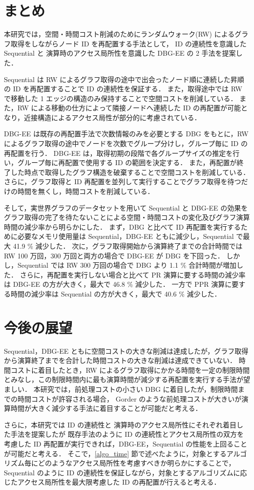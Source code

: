 \section{まとめ}
本研究では，空間・時間コスト削減のためにランダムウォーク(RW) によるグラフ取得をしながらノード ID を再配置する手法として，
ID の連続性を意識した Sequential と 演算時のアクセス局所性を意識した DBG-EE の 2 手法を提案した．

Sequential は RW によるグラフ取得の途中で出会ったノード順に連続した昇順の ID を再配置することで ID の連続性を保証する．
また，取得途中では RW で移動した 1 エッジの構造のみ保持することで空間コストを削減している．
また，RW による移動の仕方によって隣接ノードへ連続した ID の再配置が可能となり，近接構造によるアクセス局性が部分的に考慮されている．

DBG-EE は既存の再配置手法で次数情報のみを必要とする DBG をもとに，RW によるグラフ取得の途中でノードを次数でグループ分けし，グループ毎に ID の再配置を行う．
DBG-EE は，取得初期の段階で各グループサイズの推定を行い，グループ毎に再配置で使用する ID の範囲を決定する．
また，再配置が終了した時点で取得したグラフ構造を破棄することで空間コストを削減している．
さらに，グラフ取得と ID 再配置を並列して実行することでグラフ取得を待つだけの時間を無くし，時間コストを削減している．

そして，実世界グラフのデータセットを用いて Sequential と DBG-EE の効果をグラフ取得の完了を待たないことによる空間・時間コストの変化及びグラフ演算時間の減少率から明らかにした．
まず，DBG と比べて ID 再配置を実行するために必要なメモリ使用量は Sequential，DBG-EE ともに減少し，Sequential で最大 41.9 \% 減少した．
次に，グラフ取得開始から演算終了までの合計時間では RW 100 万回，300 万回と両方の場合で DBG-EE が DBG を下回った．
しかし，Sequential では RW 300 万回の場合で DBG より 1.1 \% 合計時間が増加した．
さらに，再配置を実行しない場合と比べて PR 演算に要する時間の減少率は DBG-EE の方が大きく，最大で 46.8 \% 減少した．
一方で PPR 演算に要する時間の減少率は Sequential の方が大きく，最大で 40.6 \% 減少した．

\section{今後の展望}
Sequential，DBG-EE ともに空間コストの大きな削減は達成したが，グラフ取得から演算終了までを合計した時間コストの大きな削減は達成できていない．
時間コストに着目したとき，RW によるグラフ取得にかかる時間を一定の制限時間とみなし，この制限時間内に最も演算時間が減少する再配置を実行する手法が望ましい．
本研究では，前処理コストの小さい DBG に着目したが，制限時間までの時間コストが許容される場合，
Gorder のような前処理コストが大きいが演算時間が大きく減少する手法に着目することが可能だと考える．

さらに，本研究では ID の連続性と 演算時のアクセス局所性にそれぞれ着目した手法を提案したが
既存手法のように ID の連続性とアクセス局所性の双方を考慮した ID 再配置が実行できれば，DBG-EE，Sequential の性能を上回ることが可能だと考える．
そこで，\ref{algo_time} 節で述べたように，対象とするアルゴリズム毎にどのようなアクセス局所性を考慮すべきか明らかにすることで，
Sequential のように ID の連続性を保証しながら，対象とするアルゴリズムに応じたアクセス局所性を最大限考慮した ID の再配置が行えると考える．